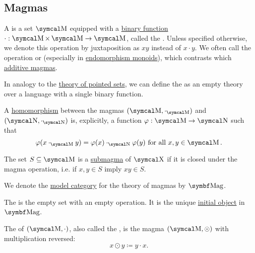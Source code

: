 \subsection{Magmas}\label{subsec:magmas}

\begin{definition}\label{def:magma}
  A  is a set \( \CM \) equipped with a \hyperref[def:function/arity]{binary function} \( \cdot: \CM \times \CM \to \CM \), called the . Unless specified otherwise, we denote this operation by juxtaposition as \( xy \) instead of \( x \cdot y \). We often call the operation  or  (especially in \hyperref[def:endomorphism_monoid]{endomorphism monoids}), which contrasts which \hyperref[remark:additive_magma]{additive magmas}.

  \begin{DefEnum}
     In analogy to the \hyperref[def:pointed_set/theory]{theory of pointed sets}, we can define the  as an empty theory over a language with a single binary function.

     A \hyperref[def:first_order_homomorphism]{homomorphism} between the magmas \( (\CM, \cdot_{\CM}) \) and \( (\CN, \cdot_{\CN}) \) is, explicitly, a function \( \varphi: \CM \to \CN \) such that
    \begin{equation}\label{eq:def:magma/homomorphism}
      \varphi(x \cdot_{\CM} y) = \varphi(x) \cdot_{\CN} \varphi(y) \Tforall x, y \in \CM.
    \end{equation}

     The set \( S \subseteq \CM \) is a \hyperref[def:first_order_substructure]{submagma} of \( \CX \) if it is closed under the magma operation, i.e. if \( x, y \in S \) imply \( xy \in S \).

     We denote the \hyperref[def:first_order_model_category]{model category} for the theory of magmas by \( \Cat{Mag} \).

     The  is the empty set with an empty operation. It is the unique \hyperref[def:zero_objects/initial]{initial object} in \( \Cat{Mag} \).

     The  of \( (\CM, \cdot) \), also called the , is the magma \( (\CM, \odot) \) with multiplication reversed:
    \begin{equation*}
      x \odot y \coloneqq y \cdot x.
    \end{equation*}


\end{DefEnum}
\end{definition}
